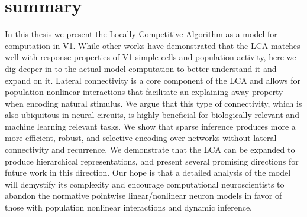 \section{summary}\label{sec:ch5_summary}
In this thesis we present the Locally Competitive Algorithm as a model for computation in V1. While other works \parencite{zhu2013visual,olshausen1997sparse,vinje2000sparse} have demonstrated that the LCA matches well with response properties of V1 simple cells and population activity, here we dig deeper in to the actual model computation to better understand it and expand on it. Lateral connectivity is a core component of the LCA and allows for population nonlinear interactions that facilitate an explaining-away property when encoding natural stimulus. We argue that this type of connectivity, which is also ubiquitous in neural circuits, is highly beneficial for biologically relevant and machine learning relevant tasks. We show that sparse inference produces more a more efficient, robust, and selective encoding over networks without lateral connectivity and recurrence. We demonstrate that the LCA can be expanded to produce hierarchical representations, and present several promising directions for future work in this direction. Our hope is that a detailed analysis of the model will demystify its complexity and encourage computational neuroscientists to abandon the normative pointwise linear/nonlinear neuron models in favor of those with population nonlinear interactions and dynamic inference.